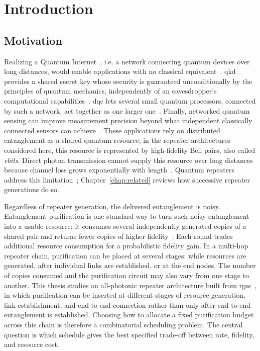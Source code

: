 \chapter{Introduction}
\label{chap:intro}

\section{Motivation}
\label{sec:intro:motivation}

Realizing a Quantum Internet~\cite{VanMeter2014Quantum,Kozlowski2023Architectural}, i.e. a network connecting quantum devices over long distances, would enable applications with no classical equivalent~\cite{Azuma2023Quantum,Hajdusek2023Quantum}. \Gls{qkd} provides a shared secret key whose security is guaranteed unconditionally by the principles of quantum mechanics, independently of an eavesdropper's computational capabilities~\cite{Bennett1992Quantum,Bennett2014Quantum,Scarani2009Security}. \Gls{dqc} lets several small quantum processors, connected by such a network, act together as one larger one~\cite{Cirac1999Distributed,Boschero2025Distributed}. Finally, networked quantum sensing can improve measurement precision beyond what independent classically connected sensors can achieve~\cite{Azuma2023Quantum,Proctor2017Networked,Proctor2018Multiparameter}. These applications rely on distributed entanglement as a shared quantum resource; in the repeater architectures considered here, this resource is represented by high-fidelity Bell pairs, also called \emph{ebits}. Direct photon transmission cannot supply this resource over long distances because channel loss grows exponentially with length~\cite{Azuma2023Quantum}. Quantum repeaters address this limitation~\cite{Briegel1998Quantum}; Chapter~\ref{chap:related} reviews how successive repeater generations do so.

Regardless of repeater generation, the delivered entanglement is noisy. Entanglement purification is one standard way to turn such noisy entanglement into a usable resource: it consumes several independently generated copies of a shared pair and returns fewer copies of higher fidelity~\cite{Bennett1996Purification,Deutsch1996Quantum}. Each round trades additional resource consumption for a probabilistic fidelity gain. In a multi-hop repeater chain, purification can be placed at several stages: while resources are generated, after individual links are established, or at the end nodes. The number of copies consumed and the purification circuit may also vary from one stage to another. This thesis studies an all-photonic repeater architecture built from \Glspl{rgs}~\cite{Azuma2015All}, in which purification can be inserted at different stages of resource generation, link establishment, and end-to-end connection rather than only after end-to-end entanglement is established. Choosing how to allocate a fixed purification budget across this chain is therefore a combinatorial scheduling problem. The central question is which schedule gives the best specified trade-off between rate, fidelity, and resource cost.

